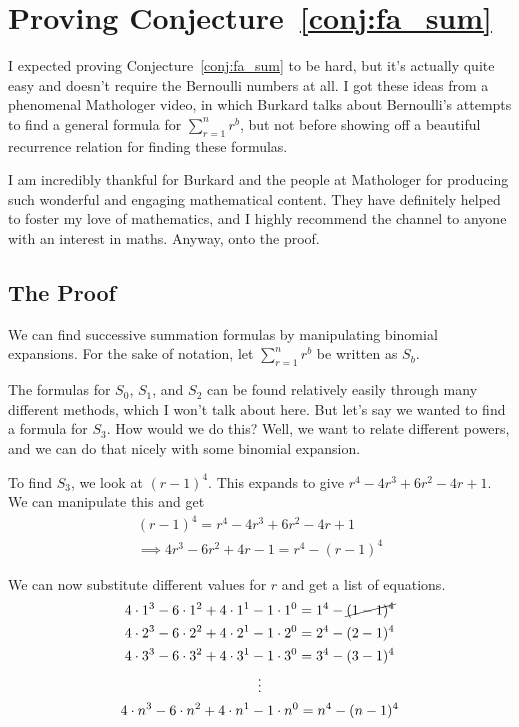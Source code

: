 \documentclass[a4paper]{article}
\newcommand{\sn}{\sum\limits_{r=1}^{n}}
\begin{document}
\section{Proving Conjecture~\ref{conj:fa_sum}}

I expected proving Conjecture~\ref{conj:fa_sum} to be hard, but it's actually quite easy and doesn't require the Bernoulli numbers at all. I got these ideas from a phenomenal Mathologer video\cite{mathologer-power-sums}, in which Burkard talks about Bernoulli's attempts to find a general formula for $\sn r^b$, but not before showing off a beautiful recurrence relation for finding these formulas.

I am incredibly thankful for Burkard and the people at Mathologer for producing such wonderful and engaging mathematical content. They have definitely helped to foster my love of mathematics, and I highly recommend the channel to anyone with an interest in maths. Anyway, onto the proof.

\subsection{The Proof}

We can find successive summation formulas by manipulating binomial expansions. For the sake of notation, let $\sn r^b$ be written as $S_b$.

The formulas for $S_0$, $S_1$, and $S_2$ can be found relatively easily through many different methods, which I won't talk about here. But let's say we wanted to find a formula for $S_3$. How would we do this? Well, we want to relate different powers, and we can do that nicely with some binomial expansion.

To find $S_3$, we look at $(r-1)^4$. This expands to give $r^4 - 4r^3 + 6r^2 - 4r + 1$. We can manipulate this and get
\begin{gather*}
(r-1)^4 = r^4 - 4r^3 + 6r^2 - 4r + 1\\[0.5em]
\implies 4r^3 - 6r^2 + 4r - 1 = r^4 - (r-1)^4
\end{gather*}

We can now substitute different values for $r$ and get a list of equations.
\begin{gather*}
4 \cdot 1^3 - 6 \cdot 1^2 + 4 \cdot 1^1 - 1 \cdot 1^0 = 1^4 - \cancel{(1-1)^4}\\
4 \cdot 2^3 - 6 \cdot 2^2 + 4 \cdot 2^1 - 1 \cdot 2^0 = 2^4 - (2-1)^4\\
4 \cdot 3^3 - 6 \cdot 3^2 + 4 \cdot 3^1 - 1 \cdot 3^0 = 3^4 - (3-1)^4\\
\vdots\\
4 \cdot n^3 - 6 \cdot n^2 + 4 \cdot n^1 - 1 \cdot n^0 = n^4 - (n-1)^4
\end{gather*}
\end{document}
